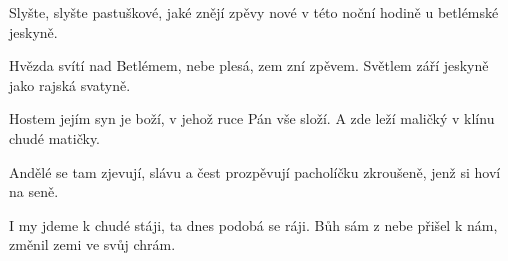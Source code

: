 \vskip-5mm
\IncludeLilypond

Slyšte, slyšte pastuškové,
jaké znějí zpěvy nové
v této noční hodině
u betlémské jeskyně.

Hvězda svítí nad Betlémem,
nebe plesá, zem zní zpěvem.
Světlem září jeskyně
jako rajská svatyně.

Hostem jejím syn je boží,
v jehož ruce Pán vše složí.
A zde leží maličký
v klínu chudé matičky.

Andělé se tam zjevují,
slávu a čest prozpěvují
pacholíčku zkroušeně,
jenž si hoví na seně.

I my jdeme k chudé stáji,
ta dnes podobá se ráji.
Bůh sám z nebe přišel k nám,
změnil zemi ve svůj chrám.
